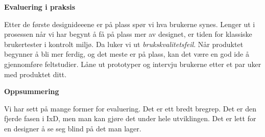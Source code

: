 \documentclass{article}
\begin{document}
\begin{flushleft}
\begin{itemize}
\end{itemize}
\textbf{Evaluering i praksis}\par 
Etter de første designideeene er på plass spør vi hva brukerne synes.
Lenger ut i prosessen når vi har begynt å få på plass mer av designet, er tiden for klassiske brukertester i kontrolt miljø. 
Da luker vi ut \emph{brukskvalitetsfeil}.
Når produktet begynner å bli mer ferdig, og det meste er på plass, kan det være en god ide å gjennomføre feltstudier. 
Låne ut prototyper og intervju brukerne etter et par uker med produktet ditt.
\bigskip

\textbf{Oppsummering}\par 
Vi har sett på mange former for evaluering. Det er ett bredt bregrep. 
Det er den fjerde fasen i IxD, men man kan gjøre det under hele utviklingen.
Det er lett for en designer å se seg blind på det man lager. 


\end{flushleft}   
\end{document}
